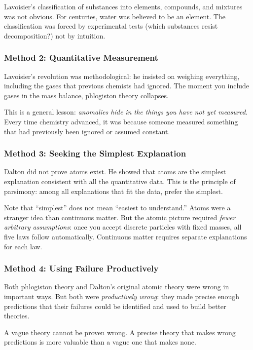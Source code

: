 \documentclass[12pt, a4paper]{book}
\theoremstyle{definition}
\begin{document}
Lavoisier's classification of substances into elements,
compounds, and mixtures was not obvious.
For centuries, water was believed to be an element.
The classification was forced by experimental tests
(which substances resist decomposition?) not by intuition.

\subsubsection{Method 2: Quantitative Measurement}

Lavoisier's revolution was methodological:
he insisted on weighing everything,
including the gases that previous chemists had ignored.
The moment you include gases in the mass balance,
phlogiston theory collapses.

This is a general lesson:
\emph{anomalies hide in the things you have not yet measured}.
Every time chemistry advanced, it was because someone measured
something that had previously been ignored or assumed constant.

\subsubsection{Method 3: Seeking the Simplest Explanation}

Dalton did not prove atoms exist.
He showed that atoms are the simplest explanation
consistent with all the quantitative data.
This is the principle of parsimony:
among all explanations that fit the data,
prefer the simplest.

Note that ``simplest'' does not mean ``easiest to understand.''
Atoms were a stranger idea than continuous matter.
But the atomic picture required \emph{fewer arbitrary assumptions}:
once you accept discrete particles with fixed masses,
all five laws follow automatically.
Continuous matter requires separate explanations for each law.

\subsubsection{Method 4: Using Failure Productively}

Both phlogiston theory and Dalton's original atomic theory
were wrong in important ways.
But both were \emph{productively wrong}: they made precise
enough predictions that their failures could be identified
and used to build better theories.

A vague theory cannot be proven wrong.
A precise theory that makes wrong predictions
is more valuable than a vague one that makes none.
\end{document}
